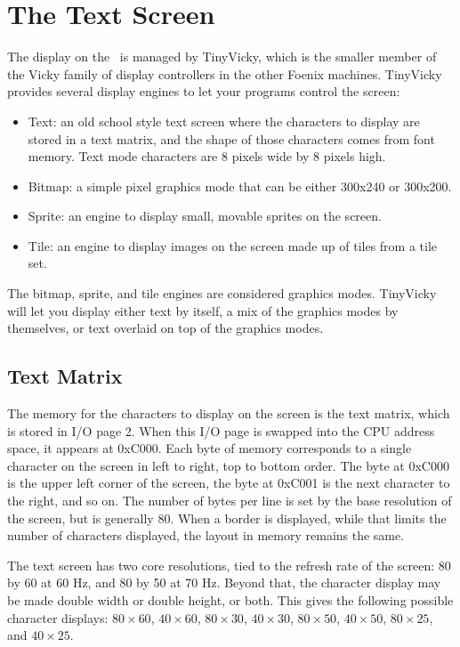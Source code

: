 \chapter{The Text Screen}

The display on the \jr\ is managed by TinyVicky, which is the smaller member of the Vicky family of display controllers in the other Foenix machines. TinyVicky provides several display engines to let your programs control the screen:

\begin{itemize}
    \item Text: an old school style text screen where the characters to display are stored in a text matrix, and the shape of those characters comes from font memory. Text mode characters are 8 pixels wide by 8 pixels high.
    \item Bitmap: a simple pixel graphics mode that can be either 300x240 or 300x200.
    \item Sprite: an engine to display small, movable sprites on the screen.
    \item Tile: an engine to display images on the screen made up of tiles from a tile set.
\end{itemize}

The bitmap, sprite, and tile engines are considered graphics modes. TinyVicky will let you display either text by itself, a mix of the graphics modes by themselves, or text overlaid on top of the graphics modes.

\section*{Text Matrix}

The memory for the characters to display on the screen is the text matrix, which is stored in I/O page 2. When this I/O page is swapped into the CPU address space, it appears at 0xC000. Each byte of memory corresponds to a single character on the screen in left to right, top to bottom order. The byte at 0xC000 is the upper left corner of the screen, the byte at 0xC001 is the next character to the right, and so on. The number of bytes per line is set by the base resolution of the screen, but is generally 80. When a border is displayed, while that limits the number of characters displayed, the layout in memory remains the same.

The text screen has two core resolutions, tied to the refresh rate of the screen: 80 by 60 at 60 Hz, and 80 by 50 at 70 Hz. Beyond that, the character display may be made double width or double height, or both. This gives the following possible character displays: $80 \times 60$, $40 \times 60$, $80 \times 30$, $40 \times 30$, $80 \times 50$, $40 \times 50$, $80 \times 25$, and $40 \times 25$.

